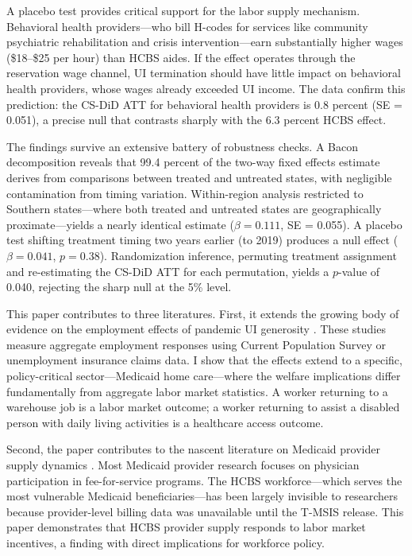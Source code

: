 \documentclass[12pt]{article}
\begin{document}
A placebo test provides critical support for the labor supply mechanism. Behavioral health providers---who bill H-codes for services like community psychiatric rehabilitation and crisis intervention---earn substantially higher wages (\$18--\$25 per hour) than HCBS aides. If the effect operates through the reservation wage channel, UI termination should have little impact on behavioral health providers, whose wages already exceeded UI income. The data confirm this prediction: the CS-DiD ATT for behavioral health providers is 0.8 percent (SE = 0.051), a precise null that contrasts sharply with the 6.3 percent HCBS effect.

The findings survive an extensive battery of robustness checks. A Bacon decomposition reveals that 99.4 percent of the two-way fixed effects estimate derives from comparisons between treated and untreated states, with negligible contamination from timing variation. Within-region analysis restricted to Southern states---where both treated and untreated states are geographically proximate---yields a nearly identical estimate ($\beta = 0.111$, SE = 0.055). A placebo test shifting treatment timing two years earlier (to 2019) produces a null effect ($\beta = 0.041$, $p = 0.38$). Randomization inference, permuting treatment assignment and re-estimating the CS-DiD ATT for each permutation, yields a $p$-value of 0.040, rejecting the sharp null at the 5\% level.

This paper contributes to three literatures. First, it extends the growing body of evidence on the employment effects of pandemic UI generosity \citep{holzer2021, coombs2022, ganong2022, dube2021}. These studies measure aggregate employment responses using Current Population Survey or unemployment insurance claims data. I show that the effects extend to a specific, policy-critical sector---Medicaid home care---where the welfare implications differ fundamentally from aggregate labor market statistics. A worker returning to a warehouse job is a labor market outcome; a worker returning to assist a disabled person with daily living activities is a healthcare access outcome.

Second, the paper contributes to the nascent literature on Medicaid provider supply dynamics \citep{dague2023, zuckerman2021}. Most Medicaid provider research focuses on physician participation in fee-for-service programs. The HCBS workforce---which serves the most vulnerable Medicaid beneficiaries---has been largely invisible to researchers because provider-level billing data was unavailable until the T-MSIS release. This paper demonstrates that HCBS provider supply responds to labor market incentives, a finding with direct implications for workforce policy.
\end{document}
